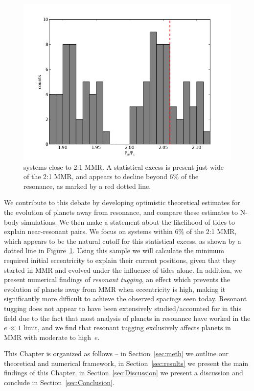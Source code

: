 \begin{figure}
\centerline{\includegraphics[scale=0.49]{chap3/MMR.png}}
\caption{ \kep{} systems close to 2:1 MMR. A statistical excess is present just wide of the 2:1 MMR, and appears to decline beyond $6\%$ of the resonance, as marked by a red dotted line. 
 }
\label{fig:MMR}
\end{figure}

We contribute to this debate by developing optimistic theoretical estimates for the evolution of planets away from resonance, and compare these estimates to N-body simulations. 
We then make a statement about the likelihood of tides to explain near-resonant pairs. 
We focus on \kep{} systems within $6\%$ of the 2:1 MMR, which appears to be the natural cutoff for this statistical excess, as shown by a dotted line in Figure~\ref{fig:MMR}. 
Using this sample we will calculate the minimum required initial eccentricity to explain their current positions, given that they started in MMR and evolved under the influence of tides alone. 
In addition, we present numerical findings of {\it resonant tugging}, an effect which prevents the evolution of planets away from MMR when eccentricity is high, making it significantly more difficult to achieve the observed spacings seen today. 
Resonant tugging does not appear to have been extensively studied/accounted for in this field due to the fact that most analysis of planets in resonance have worked in the $e \ll 1$ limit, and we find that resonant tugging exclusively affects planets in MMR with moderate to high~$e$. 

This Chapter is organized as follows -- in Section~\ref{sec:meth} we outline our theoretical and numerical framework, in Section~\ref{sec:results} we present the main findings of this Chapter, in Section~\ref{sec:Discussion} we present a discussion and conclude in Section~\ref{sec:Conclusion}.

